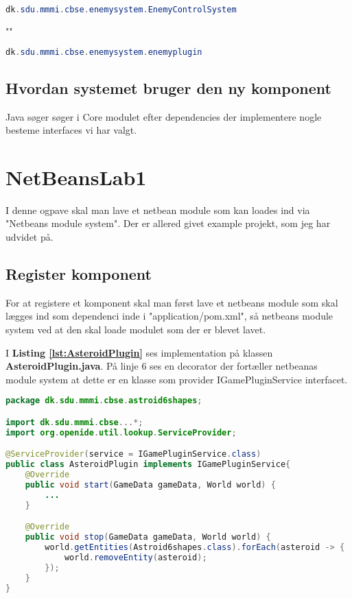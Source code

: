 \begin{lstlisting}[caption={dk.sdu.mmmi.cbse.common.services.IEntityProcessingService}, label={lst:App}, language=java]
dk.sdu.mmmi.cbse.enemysystem.EnemyControlSystem
\end{lstlisting}
""
\begin{lstlisting}[caption={dk.sdu.mmmi.cbse.common.services.igamepluginservice}, label={lst:app}, language=java]
dk.sdu.mmmi.cbse.enemysystem.enemyplugin
\end{lstlisting}


\subsection{Hvordan systemet bruger den ny komponent}
Java søger søger i Core modulet efter dependencies der implementere nogle
besteme interfaces vi har valgt.




\newpage
\section{NetBeansLab1}
I denne ogpave skal man lave et netbean module som kan loades ind via
"Netbeans module system". Der er allered givet example projekt, som jeg har
udvidet på.

\subsection{Register komponent}
For at registere et komponent skal man først lave et netbeans module som skal
lægges ind som dependenci inde i "application/pom.xml", så netbeans module
system ved at den skal loade modulet som der er blevet lavet.


I \textbf{Listing \ref{lst:AsteroidPlugin}} ses implementation på klassen
\textbf{AsteroidPlugin.java}. På linje 6 ses en decorator der fortæller netbeanas module 
system at dette er en klasse som provider IGamePluginService interfacet.

\begin{lstlisting}[caption={AsteroidPlugin.java}, label={lst:AsteroidPlugin}, language=java]
package dk.sdu.mmmi.cbse.astroid6shapes;

import dk.sdu.mmmi.cbse...*;
import org.openide.util.lookup.ServiceProvider;

@ServiceProvider(service = IGamePluginService.class)
public class AsteroidPlugin implements IGamePluginService{
	@Override
    public void start(GameData gameData, World world) {
        ...
    }

    @Override
    public void stop(GameData gameData, World world) {
		world.getEntities(Astroid6shapes.class).forEach(asteroid -> {
			world.removeEntity(asteroid);
		});
    }
}
\end{lstlisting}

